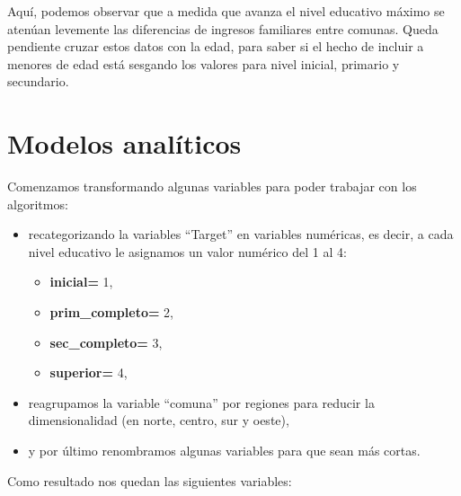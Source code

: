 \documentclass[a4paper]{article}
\begin{document}
        Aquí, podemos observar que a medida que avanza el nivel educativo máximo se atenúan levemente las diferencias de ingresos familiares entre comunas. Queda pendiente cruzar estos datos con la edad, para saber si el hecho de incluir a menores de edad está sesgando los valores para nivel inicial, primario y secundario.
 
\newpage

\section{Modelos analíticos}

    Comenzamos transformando algunas variables para poder trabajar con los algoritmos:
    \begin{itemize}
        \item recategorizando la variables ``Target'' en variables numéricas, es decir, a cada nivel educativo le asignamos un valor numérico del 1 al 4:
        \begin{itemize}
            \item \textbf{inicial=} 1,
            \item \textbf{prim\_completo=} 2,
            \item \textbf{sec\_completo=} 3,
            \item \textbf{superior=} 4,
        \end{itemize}
        \item reagrupamos la variable ``comuna'' por regiones para reducir la dimensionalidad (en norte, centro, sur y oeste),
        \item y por último renombramos algunas variables para que sean más cortas.
    \end{itemize}

    Como resultado nos quedan las siguientes variables:
    
\end{document}
